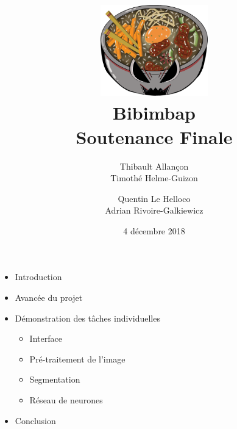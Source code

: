 \documentclass[14pt]{extarticle}
\title{
    {\protect\centering\protect\includegraphics[width=0.35\textwidth]{logo_bibimbap2.png}}\\
	{\large Bibimbap}\\
	{Soutenance Finale}\\
}
\author{
	Thibault Allançon\\
	Timothé Helme-Guizon
	\and
	Quentin Le Helloco\\
	Adrian Rivoire-Galkiewicz
}
\date{4 décembre 2018}
\begin{document}
\maketitle
\vspace{2em}

\begin{itemize}
    \item Introduction
    \item Avancée du projet
    \item Démonstration des tâches individuelles
    \begin{itemize}
        \item Interface
        \item Pré-traitement de l'image
        \item Segmentation
        \item Réseau de neurones
    \end{itemize}
    \item Conclusion
\end{itemize}
\end{document}
